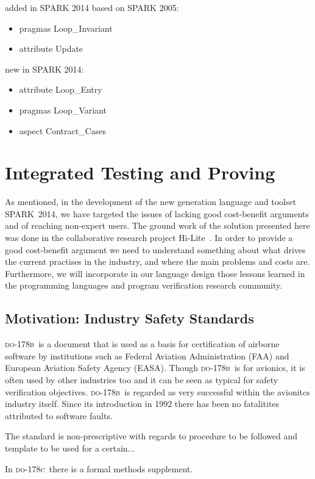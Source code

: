 \documentclass[sttt,draft]{svjour}
\newcommand{\DOB}{\textsc{do-178b}}
\newcommand{\DOC}{\textsc{do-178c}}
\newcommand{\hilite}{Hi-Lite}
\newcommand{\newspark}{SPARK~2014\xspace}
\begin{document}
\noindent
added in SPARK 2014 based on SPARK 2005:
\begin{itemize}
\item pragmas Loop\_Invariant
\item attribute Update
\end{itemize}

\noindent
new in SPARK 2014:
\begin{itemize}
\item attribute Loop\_Entry
\item pragmas Loop\_Variant
\item aspect Contract\_Cases
\end{itemize}

\section{Integrated Testing and Proving}
\label{hilite}
As mentioned, in the development of the new generation language and
toolset \newspark, we have targeted the issues of lacking good
cost-benefit arguments and of reaching non-expert users. The ground
work of the solution presented here was done in the collaborative
research project \hilite\ \cite{hiliteERTS2012}. In order to provide a
good cost-benefit argument we need to understand something about what
drives the current practises in the industry, and where the main
problems and costs are. Furthermore, we will incorporate in our
language design those lessons learned in the programming languages and
program verification research community.

\subsection{Motivation: Industry Safety Standards}
\DOB\ is a document that is used as a basis for certification of
airborne software by institutions such as Federal Aviation
Administration (FAA) and European Aviation Safety Agency
(EASA). Though \DOB\ is for avionics, it is often used by other
industries too and it can be seen as typical for safety verification
objectives. \DOB\ is regarded as very successful within the avionitcs
industry itself. Since its introduction in 1992 there has been no
fatalitites attributed to software faults. 

The standard is non-prescriptive with regards to procedure to be
followed and template to be used for a certain...

In \DOC\ there is a formal methods supplement. 
\end{document}
